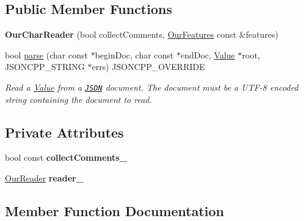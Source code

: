 \subsection*{Public Member Functions}
\begin{DoxyCompactItemize}
\item 
\mbox{\label{classJson_1_1OurCharReader_a5015506620e7ba7bab417756fa1ca9fe}} 
{\bfseries Our\+Char\+Reader} (bool collect\+Comments, \hyperlink{classJson_1_1OurFeatures}{Our\+Features} const \&features)
\item 
bool \hyperlink{classJson_1_1OurCharReader_a547f08ec5a9951ca69e8bb2e90296c83}{parse} (char const $\ast$begin\+Doc, char const $\ast$end\+Doc, \hyperlink{classJson_1_1Value}{Value} $\ast$root, J\+S\+O\+N\+C\+P\+P\+\_\+\+S\+T\+R\+I\+NG $\ast$errs) J\+S\+O\+N\+C\+P\+P\+\_\+\+O\+V\+E\+R\+R\+I\+DE
\begin{DoxyCompactList}\small\item\em Read a \hyperlink{classJson_1_1Value}{Value} from a \href{http://www.json.org}{\tt J\+S\+ON} document. The document must be a U\+T\+F-\/8 encoded string containing the document to read. \end{DoxyCompactList}\end{DoxyCompactItemize}
\subsection*{Private Attributes}
\begin{DoxyCompactItemize}
\item 
\mbox{\label{classJson_1_1OurCharReader_aa6afd3d0f754cadad0f6d2be38bcfee0}} 
bool const {\bfseries collect\+Comments\+\_\+}
\item 
\mbox{\label{classJson_1_1OurCharReader_aedd4520b8570654ed7aa0726075ee58d}} 
\hyperlink{classJson_1_1OurReader}{Our\+Reader} {\bfseries reader\+\_\+}
\end{DoxyCompactItemize}


\subsection{Member Function Documentation}
\mbox{\label{classJson_1_1OurCharReader_a547f08ec5a9951ca69e8bb2e90296c83}} 
